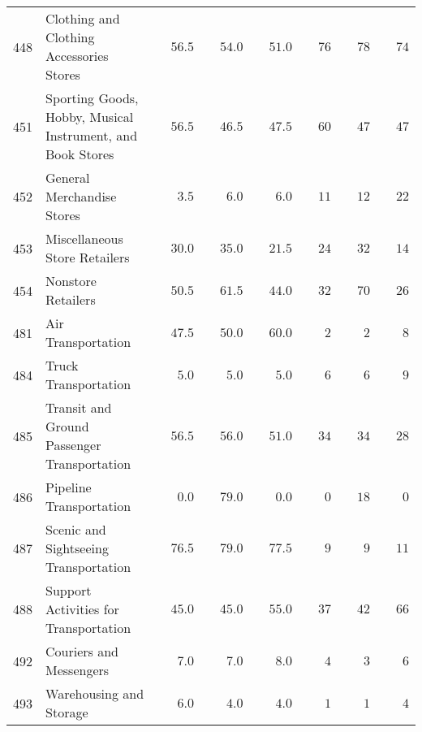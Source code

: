 \documentclass[9pt, oneside]{article}   	%
\begin{document}
\begin{longtable}{lp{3in}cccccc}
448  & Clothing and Clothing Accessories Stores & $\phantom{00}56.5$ & $\phantom{00}54.0$ & $\phantom{00}51.0$ & $\phantom{00}76$ & $\phantom{00}78$ & $\phantom{00}74$ \\
451  & Sporting Goods, Hobby, Musical Instrument, and Book Stores & $\phantom{00}56.5$ & $\phantom{00}46.5$ & $\phantom{00}47.5$ & $\phantom{00}60$ & $\phantom{00}47$ & $\phantom{00}47$ \\
452  & General Merchandise Stores & $\phantom{000}3.5$ & $\phantom{000}6.0$ & $\phantom{000}6.0$ & $\phantom{00}11$ & $\phantom{00}12$ & $\phantom{00}22$ \\
453  & Miscellaneous Store Retailers & $\phantom{00}30.0$ & $\phantom{00}35.0$ & $\phantom{00}21.5$ & $\phantom{00}24$ & $\phantom{00}32$ & $\phantom{00}14$ \\
454  & Nonstore Retailers & $\phantom{00}50.5$ & $\phantom{00}61.5$ & $\phantom{00}44.0$ & $\phantom{00}32$ & $\phantom{00}70$ & $\phantom{00}26$ \\
481  & Air Transportation & $\phantom{00}47.5$ & $\phantom{00}50.0$ & $\phantom{00}60.0$ & $\phantom{000}2$ & $\phantom{000}2$ & $\phantom{000}8$ \\
484  & Truck Transportation & $\phantom{000}5.0$ & $\phantom{000}5.0$ & $\phantom{000}5.0$ & $\phantom{000}6$ & $\phantom{000}6$ & $\phantom{000}9$ \\
485  & Transit and Ground Passenger Transportation & $\phantom{00}56.5$ & $\phantom{00}56.0$ & $\phantom{00}51.0$ & $\phantom{00}34$ & $\phantom{00}34$ & $\phantom{00}28$ \\
486  & Pipeline Transportation & $\phantom{000}0.0$ & $\phantom{00}79.0$ & $\phantom{000}0.0$ & $\phantom{000}0$ & $\phantom{00}18$ & $\phantom{000}0$ \\
487  & Scenic and Sightseeing Transportation & $\phantom{00}76.5$ & $\phantom{00}79.0$ & $\phantom{00}77.5$ & $\phantom{000}9$ & $\phantom{000}9$ & $\phantom{00}11$ \\
488  & Support Activities for Transportation & $\phantom{00}45.0$ & $\phantom{00}45.0$ & $\phantom{00}55.0$ & $\phantom{00}37$ & $\phantom{00}42$ & $\phantom{00}66$ \\
492  & Couriers and Messengers & $\phantom{000}7.0$ & $\phantom{000}7.0$ & $\phantom{000}8.0$ & $\phantom{000}4$ & $\phantom{000}3$ & $\phantom{000}6$ \\
493  & Warehousing and Storage & $\phantom{000}6.0$ & $\phantom{000}4.0$ & $\phantom{000}4.0$ & $\phantom{000}1$ & $\phantom{000}1$ & $\phantom{000}4$ \\

\end{longtable}
\end{document}
